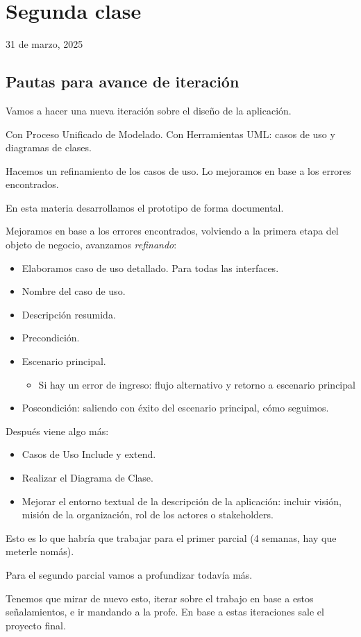 \section{Segunda clase}

31 de marzo, 2025

\subsection{Pautas para avance de iteración}

Vamos a hacer una nueva iteración sobre el diseño de la aplicación.

Con Proceso Unificado de Modelado.
Con Herramientas UML: casos de uso y diagramas de clases.

Hacemos un refinamiento de los casos de uso.
Lo mejoramos en base a los errores encontrados.

En esta materia desarrollamos el prototipo de forma documental.

Mejoramos en base a los errores encontrados,
volviendo a la primera etapa del objeto de negocio,
avanzamos \textit{refinando}:
\begin{itemize}
    \item Elaboramos caso de uso detallado. Para todas las interfaces.
    \item Nombre del caso de uso.
    \item Descripción resumida.
    \item Precondición.
    \item Escenario principal.
    \begin{itemize}
        \item Si hay un error de ingreso: flujo alternativo y retorno a escenario principal
    \end{itemize}
    \item Poscondición: saliendo con éxito del escenario principal, cómo seguimos.
\end{itemize}

Después viene algo más:
\begin{itemize}
    \item Casos de Uso Include y extend.
    \item Realizar el Diagrama de Clase.
    \item Mejorar el entorno textual de la descripción de la aplicación: incluir visión, misión de la organización, rol de los actores o stakeholders.
\end{itemize}

Esto es lo que habría que trabajar para el primer parcial (4 semanas, hay que meterle nomás).

Para el segundo parcial vamos a profundizar todavía más.

Tenemos que mirar de nuevo esto,
iterar sobre el trabajo en base a estos señalamientos,
e ir mandando a la profe.
En base a estas iteraciones sale el proyecto final.
